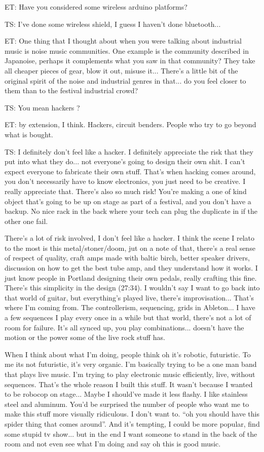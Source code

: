 ET: Have you considered some wireless arduino platforms? 

TS: I've done some wireless shield, I guess I haven't done bluetooth...

ET: One thing that I thought about when you were talking about industrial music is noise music communities. One example is the community described in Japanoise, perhaps it complements what you saw in that community? They take all cheaper pieces of gear, blow it out, misuse it... There's a little bit of the original spirit of the noise and industrial genres in that... do you feel closer to them than to the festival industrial crowd? 

TS: You mean hackers ? 

ET: by extension, I think. Hackers, circuit benders. People who try to go beyond what is bought. 

TS: I definitely don't feel like a hacker. I definitely appreciate the risk that they put into what they do... not everyone's going to design their own shit. I can't expect everyone to fabricate their own stuff. That's when hacking comes around, you don't necessarily have to know electronics, you just need to be creative. I really appreciate that. There's also so much risk! You're making a one of kind object that's going to be up on stage as part of a festival, and you don't have a backup. No nice rack in the back where your tech can plug the duplicate in if the other one fail. 

There's a lot of risk involved, I don't feel like a hacker. I think the scene I relato to the most is this metal/stoner/doom, jut on a note of that, there's a real sense of respect of quality, craft amps made with baltic birch, better speaker  drivers, discussion on how to get the best tube amp, and they understand how it works. I just know people in Portland designing their own pedals, really crafting this fine. There's this simplicity in the design (27:34). I wouldn't say I want to go back into that world of guitar, but everything's played live, there's improvisation... That's where I'm coming from. The controllerism, sequencing, grids in Ableton... I have a few sequences I play every once in a while but that world, there's not a lot of room for failure. It's all synced up, you play combinations... doesn't have the motion or the power some of the live rock stuff has. 

When I think about what I'm doing, people think oh it's robotic, futuristic. To me its not futuristic, it's very organic. I'm basically trying to be a one man band that plays live music. I'm trying to play electronic music efficiently, live, without sequences. That's the whole reason I built this stuff. It wasn't because I wanted to be robocop on stage... Maybe I should've made it less flashy. I like stainless steel and aluminum. You'd be surprised the number of people who want me to make this stuff more visually ridiculous. I don't want to. ``oh you should have this spider thing that comes around''. And it's tempting, I could be more popular, find some stupid tv show... but in the end I want someone to stand in the back of the room and not even see what I'm doing and say oh this is good music. 

